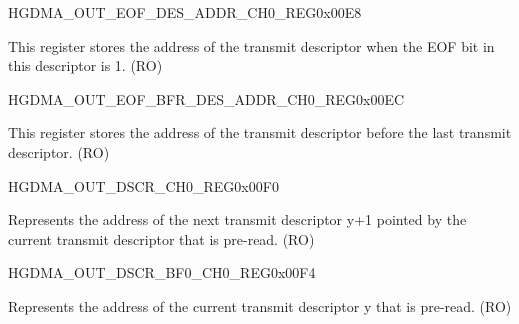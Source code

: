 \begin{register}{H}{GDMA\_OUT\_EOF\_DES\_ADDR\_CH0\_REG}{0x00E8}\label{regdesc:GDMAOUTEOFDESADDRCH0REG}
%
\regnewline%
\begin{regdesc}\begin{reglist}
\label{fielddesc:GDMAOUTEOFDESADDRCH0}\item [GDMA\_OUT\_EOF\_DES\_ADDR\_CH0] This register stores the address of the transmit descriptor when the EOF bit in this descriptor is 1. (RO)
\end{reglist}\end{regdesc}
\end{register}


\begin{register}{H}{GDMA\_OUT\_EOF\_BFR\_DES\_ADDR\_CH0\_REG}{0x00EC}\label{regdesc:GDMAOUTEOFBFRDESADDRCH0REG}
%
\regnewline%
\begin{regdesc}\begin{reglist}
\label{fielddesc:GDMAOUTEOFBFRDESADDRCH0}\item [GDMA\_OUT\_EOF\_BFR\_DES\_ADDR\_CH0] This register stores the address of the transmit descriptor before the last transmit descriptor. (RO)
\end{reglist}\end{regdesc}
\end{register}


\begin{register}{H}{GDMA\_OUT\_DSCR\_CH0\_REG}{0x00F0}\label{regdesc:GDMAOUTDSCRCH0REG}
%
\regnewline%
\begin{regdesc}\begin{reglist}
\label{fielddesc:GDMAOUTLINKDSCRCH0}\item [GDMA\_OUTLINK\_DSCR\_CH0] Represents the address of the next transmit descriptor y+1 pointed by the current transmit descriptor that is pre-read. (RO)
\end{reglist}\end{regdesc}
\end{register}


\begin{register}{H}{GDMA\_OUT\_DSCR\_BF0\_CH0\_REG}{0x00F4}\label{regdesc:GDMAOUTDSCRBF0CH0REG}
%
\regnewline%
\begin{regdesc}\begin{reglist}
\label{fielddesc:GDMAOUTLINKDSCRBF0CH0}\item [GDMA\_OUTLINK\_DSCR\_BF0\_CH0] Represents the address of the current transmit descriptor y that is pre-read. (RO)
\end{reglist}\end{regdesc}
\end{register}


